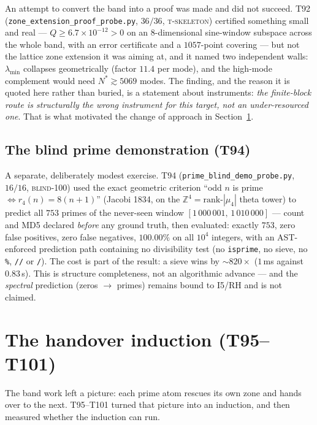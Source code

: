 \documentclass[11pt,a4paper]{article}
\newcommand{\Z}{\mathbb Z}
\begin{document}
An attempt to convert the band into a proof was made and did not succeed. T92
(\texttt{zone\_extension\_proof\_probe.py}, $36/36$, \textsc{t-skeleton}) certified something small and
real --- $Q\ge6.7\times10^{-12}>0$ on an $8$-dimensional sine-window subspace across the whole band,
with an error certificate and a $1057$-point covering --- but not the lattice zone extension it was
aiming at, and it named two independent walls: $\lambda_{\min}$ collapses geometrically (factor $11.4$
per mode), and the high-mode complement would need $N^*\gtrsim5069$ modes. The finding, and the reason
it is quoted here rather than buried, is a statement about instruments: \emph{the finite-block route is
structurally the wrong instrument for this target, not an under-resourced one}. That is what motivated
the change of approach in Section~\ref{sec:handover}.

\subsection{The blind prime demonstration (T94)}
A separate, deliberately modest exercise. T94 (\texttt{prime\_blind\_demo\_probe.py}, $16/16$,
\textsc{blind-100}) used the exact geometric criterion ``odd $n$ is prime $\iff r_4(n)=8(n+1)$''
(Jacobi 1834, on the $\Z^4=\text{rank-}|\mu_4|$ theta tower) to predict all $753$ primes of the
never-seen window $[1\,000\,001,\,1\,010\,000]$ --- count and MD5 declared \emph{before} any ground
truth, then evaluated: exactly $753$, zero false positives, zero false negatives, $100.00\%$ on all
$10^4$ integers, with an AST-enforced prediction path containing no divisibility test (no
\texttt{isprime}, no sieve, no \texttt{\%}, \texttt{//} or \texttt{/}). The cost is part of the
result: a sieve wins by ${\sim}820\times$ ($1$\,ms against $0.83$\,s). This is structure completeness,
not an algorithmic advance --- and the \emph{spectral} prediction (zeros $\to$ primes) remains bound to
I5/RH and is not claimed.

\section{The handover induction (T95--T101)}\label{sec:handover}
The band work left a picture: each prime atom rescues its own zone and hands over to the next. T95--T101
turned that picture into an induction, and then measured whether the induction can run.
\end{document}
